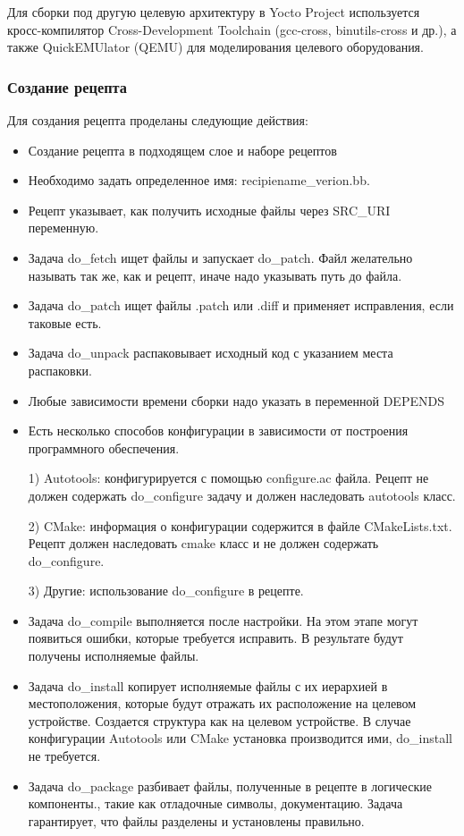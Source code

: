 Для сборки под другую целевую архитектуру в Yocto Project используется кросс-компилятор Cross-Development Toolchain (gcc-cross, binutils-cross и др.), 
а также QuickEMUlator (QEMU) для моделирования целевого оборудования.

\subsubsection{Создание рецепта}

Для создания рецепта проделаны следующие действия:
\begin{itemize}
	\item Создание рецепта в подходящем слое и наборе рецептов
	\item Необходимо задать определенное имя: recipiename\_verion.bb. 
	\item Рецепт указывает, как получить исходные файлы через SRC\_URI переменную.
	\item Задача do\_fetch ищет файлы и запускает do\_patch. Файл желательно называть так же, как и рецепт, иначе надо указывать путь до файла.
	\item Задача do\_patch ищет файлы .patch или .diff и применяет исправления, если таковые есть.
	\item Задача do\_unpack распаковывает исходный код с указанием места распаковки.
	\item Любые зависимости времени сборки надо указать в переменной DEPENDS
	\item Есть несколько способов конфигурации в зависимости от построения программного обеспечения.

1)	Autotools: конфигурируется с помощью configure.ac файла. Рецепт не должен содержать do\_configure задачу и должен наследовать autotools класс.

2)	CMake: информация о конфигурации содержится в файле CMakeLists.txt. Рецепт должен наследовать cmake класс и не должен содержать do\_configure.

3)	Другие: использование do\_configure в рецепте.
	\item Задача do\_compile выполняется после настройки. На этом этапе могут появиться ошибки, которые требуется исправить. В результате будут получены исполняемые файлы.
	\item Задача do\_install копирует исполняемые файлы с их иерархией в местоположения, которые будут отражать их расположение на целевом устройстве. Создается структура как на целевом устройстве. В случае конфигурации Autotools или CMake установка производится ими, do\_install не требуется.
	\item Задача do\_package разбивает файлы, полученные в рецепте в логические компоненты., такие как отладочные символы, документацию. Задача гарантирует, что файлы разделены и установлены правильно.
\end{itemize}

